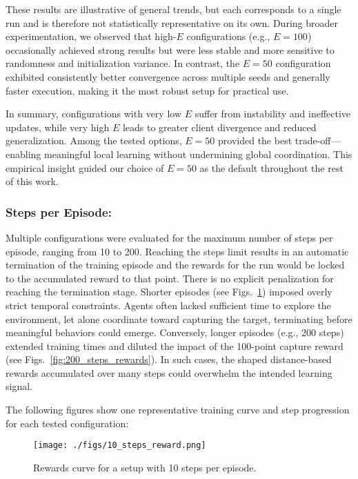 \documentclass[12pt,a4paper,twoside,openany]{book}
\begin{document}
These results are illustrative of general trends, but each corresponds to a single run and is therefore not statistically representative on its own. During broader experimentation, we observed that high-$E$ configurations (e.g., $E=100$) occasionally achieved strong results but were less stable and more sensitive to randomness and initialization variance. In contrast, the $E=50$ configuration exhibited consistently better convergence across multiple seeds and generally faster execution, making it the most robust setup for practical use.

In summary, configurations with very low $E$ suffer from instability and ineffective updates, while very high $E$ leads to greater client divergence and reduced generalization. Among the tested options, $E=50$ provided the best trade-off—enabling meaningful local learning without undermining global coordination. This empirical insight guided our choice of $E=50$ as the default throughout the rest of this work.


\subsubsection{Steps per Episode:}
Multiple configurations were evaluated for the maximum number of steps per episode, ranging from 10 to 200. Reaching the steps limit results in an automatic termination of the training episode and the rewards for the run would be locked to the accumulated reward to that point. There is no explicit penalization for reaching the termination stage. 
Shorter episodes (see Figs.~\ref{fig:10_steps_rewards}) imposed overly strict temporal constraints. Agents often lacked sufficient time to explore the environment, let alone coordinate toward capturing the target, terminating before meaningful behaviors could emerge. Conversely, longer episodes (e.g., 200 steps) extended training times and diluted the impact of the 100-point capture reward (see Figs.~\ref{fig:200_steps_rewards}). In such cases, the shaped distance-based rewards accumulated over many steps could overwhelm the intended learning signal. 

The following figures show one representative training curve and step progression for each tested configuration:

\begin{figure}[H]
\centering
\texttt{[image: ./figs/10\_steps\_reward.png]}
\captionsetup{font=small}
\caption{Rewards curve for a setup with 10 steps per episode.}
\label{fig:10_steps_rewards}
\end{figure}
\end{document}
